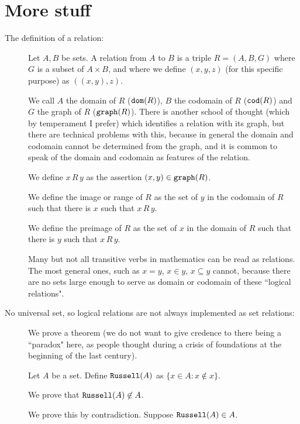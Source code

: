 \documentclass[12pt]{article}
\begin{document}
\newpage

\section{More stuff}

\begin{description}

\item[The definition of a relation:]

Let $A,B$ be sets.  A relation from $A$ to $B$ is a triple $R=(A,B,G)$ where $G$ is a subset of $A \times B$, and where we define $(x,y,z)$ (for this specific purpose) as $((x,y),z)$.

We call $A$ the domain of $R$ (${\tt dom}(R)$), $B$ the codomain of $R$ (${\tt cod}(R)$) and $G$ the graph of $R$ (${\tt graph}(R)$).   There is another school of thought
(which by temperament I prefer) which identifies a relation with its graph, but there are technical problems with this, because in general the domain and codomain cannot be determined from the graph, and it is common to speak of the domain and codomain as features of the relation.

We define $x \,R\, y$ as the assertion $(x,y) \in {\tt graph}(R)$.

We define the image or range of $R$ as the set of $y$ in the codomain of $R$ such that there is $x$ such that $x \, R \, y$.

We define the preimage of $R$ as the set of $x$ in the domain of $R$ such that there is $y$ such that $x \, R \, y$.

Many but not all transitive verbs in mathematics can be read as relations.  The most general ones, such
as $x = y$, $x \in y$, $x \subseteq y$ cannot, because there are no sets large enough to serve as domain or codomain of these ``logical relations".

\item[No universal set, so logical relations are not always implemented as set relations:]

We prove a theorem (we do not want to give credence to there being a ``paradox" here, as people thought during a crisis of foundations at the beginning of the last century).

Let $A$ be a set.  Define ${\tt Russell}(A)$ as $\{x \in A:x \not\in x\}$.

We prove that ${\tt Russell}(A)\not\in A$.

We prove this by contradiction.  Suppose ${\tt Russell}(A)\in A$.  


\end{description}
\end{document}
